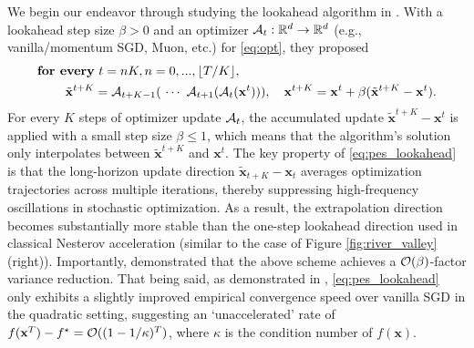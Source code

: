 \documentclass{article}
\theoremstyle{plain}
\theoremstyle{definition}
\theoremstyle{remark}
\def\bx{\mathbf{x}}
\begin{document}
We begin our endeavor through studying the lookahead algorithm in 
\cite{nichol2018first,zhang2019lookahead}. With a lookahead step size $\beta > 0$ and an optimizer ${\cal A}_t: \mathbb{R}^d \to \mathbb{R}^d$ (e.g., vanilla/momentum SGD, Muon, etc.) for \eqref{eq:opt}, they proposed
\begin{equation} \label{eq:pes_lookahead} 
    \begin{aligned}
    \textbf{for every}&~ t=nK, n = 0, ..., \lfloor T/K \rfloor,\\
        \tilde{\bx}^{t+K} &= {\cal A}_{t+K-1}(~\cdots ~{\cal A}_{t+1}( {\cal A}_t(\bx^t) ) ) , \quad \bx^{t+K} = \bx^t + \beta (\tilde{\bx}^{t+K} - \bx^t) .
    \end{aligned}
\end{equation}
For every $K$ steps of optimizer update ${\cal A}_t$, the accumulated update $\tilde{\bx}^{t+K} - \bx^t$ is applied with a small step size $\beta \leq 1$, which means that the algorithm's solution only interpolates between $\tilde{\bx}^{t+K}$ and $\bx^t$. 
{The key property of \eqref{eq:pes_lookahead} is that the long-horizon update direction $\tilde{\bx}_{t+K}-\bx_t$ averages optimization trajectories across multiple iterations, thereby suppressing high-frequency oscillations in stochastic optimization. As a result, the extrapolation direction becomes substantially more stable than the one-step lookahead direction used in classical Nesterov acceleration (similar to the case of Figure \ref{fig:river_valley} (right)).}
Importantly, \citep[Proposition 2]{zhang2019lookahead} demonstrated that the above scheme achieves a ${\cal O}(\beta)$-factor variance reduction. That being said, as demonstrated in \citep[Appendix A]{zhang2019lookahead}, \eqref{eq:pes_lookahead} only exhibits a slightly improved empirical convergence speed over vanilla SGD in the quadratic setting,
suggesting an `unaccelerated' rate of $f( \bx^T) - f^\star = {\cal O}( (1-1/\kappa)^T )$, where $\kappa$ is the condition number of $f (\bx)$.
\end{document}
